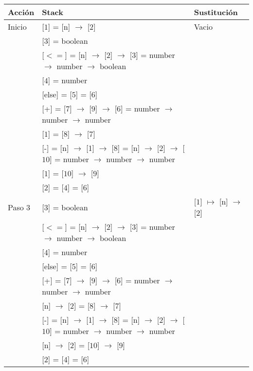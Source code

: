 \documentclass{article}
\begin{document}
\begin{center}
 \begin{longtable}{ | l | p{10 cm} | p{5 cm} | }
  \hline
  Acción & Stack & Sustitución \\ \hline \hline
  Inicio & [$\boxed{1}$] = [n] $\rightarrow$ [$\boxed{2}$] 									& Vacio	\\
	 & [$\boxed{3}$] = boolean		     										&   	\\
	 & [$<=$] = [n] $\rightarrow$ [2] $\rightarrow$ [$\boxed{3}$] = 
	 number $\rightarrow$ number $\rightarrow$ boolean									& 	\\ 
	 & [$\boxed{4}$] = number												&	\\ 
	 & [else] = [$\boxed{5}$] = [$\boxed{6}$]										&	\\
	 & [+] = [$\boxed{7}$] $\rightarrow$ [$\boxed{9}$] $\rightarrow$ [$\boxed{6}$] = 
	 number $\rightarrow$ number $\rightarrow$ number									&	\\ 
	 & [$\boxed{1}$] = [$\boxed{8}$] $\rightarrow$ [$\boxed{7}$]								&	\\
	 & [-] = [n] $\rightarrow$ [1] $\rightarrow$ [$\boxed{8}$] = [n] $\rightarrow$ [2] $\rightarrow$ [$\boxed{10}$] =
	   number $\rightarrow$ number $\rightarrow$ number									&	\\
	 & [$\boxed{1}$] = [$\boxed{10}$] $\rightarrow$ [$\boxed{9}$] 								&	\\ 
	 & [$\boxed{2}$] = [$\boxed{4}$] = [$\boxed{6}$]									&	\\ \hline
	 
  Paso 3 & [$\boxed{3}$] = boolean		     										& [$\boxed{1}$] $\mapsto$ [n] $\rightarrow$ [$\boxed{2}$]  \\
	 & [$<=$] = [n] $\rightarrow$ [2] $\rightarrow$ [$\boxed{3}$] = 
	 number $\rightarrow$ number $\rightarrow$ boolean									& 	\\ 
	 & [$\boxed{4}$] = number												&	\\ 
	 & [else] = [$\boxed{5}$] = [$\boxed{6}$]										&	\\
	 & [+] = [$\boxed{7}$] $\rightarrow$ [$\boxed{9}$] $\rightarrow$ [$\boxed{6}$] = 
	 number $\rightarrow$ number $\rightarrow$ number									&	\\ 
	 & [n] $\rightarrow$ [$\boxed{2}$] = [$\boxed{8}$] $\rightarrow$ [$\boxed{7}$]						&	\\
	 & [-] = [n] $\rightarrow$ [1] $\rightarrow$ [$\boxed{8}$] = [n] $\rightarrow$ [2] $\rightarrow$ [$\boxed{10}$] =
	   number $\rightarrow$ number $\rightarrow$ number									&	\\
	 & [n] $\rightarrow$ [$\boxed{2}$] = [$\boxed{10}$] $\rightarrow$ [$\boxed{9}$] 					&	\\ 
	 & [$\boxed{2}$] = [$\boxed{4}$] = [$\boxed{6}$]									&	\\ \hline
	 

\end{longtable}
\end{center}
\end{document}
